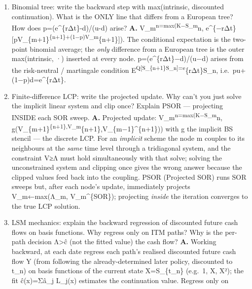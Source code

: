 \documentclass[
  11pt,
]{article}
\begin{document}
\begin{enumerate}
  the recursion for n=N,\ldots,2 is
  c(x,t\_\{n−1\})=e\^{}\{−rΔt\}E{[}v(X(t\_n),t\_n)\textbar X(t\_\{n−1\})=x{]},
  v(x,t\_\{n−1\})=max(Λ(x,t\_\{n−1\}),c(x,t\_\{n−1\})). All four methods
  (tree, FD/LCP, LSM, COS) run exactly this Bellman recursion; they
  differ \emph{only} in how they compute the conditional expectation c
  --- the continuation value.
\item
  Binomial tree: write the backward step with max(intrinsic, discounted
  continuation). What is the ONLY line that differs from a European
  tree? How does p=(e\^{}\{rΔt\}-d)/(u-d) arise? \textbf{A.}
  V\_m\textsuperscript{n=max(K−S\_m}n,
  e\^{}\{−rΔt\}{[}pV\_\{m+1\}\textsuperscript{\{n+1\}+(1−p)V\_m}\{n+1\}{]}).
  The conditional expectation is the two-point binomial average; the
  \emph{only} difference from a European tree is the outer
  max(intrinsic, ·) inserted at every node. p=(e\^{}\{rΔt\}−d)/(u−d)
  arises from the risk-neutral / martingale condition
  E\textsuperscript{Q{[}S\_\{n+1\}\textbar S\_n{]}=e}\{rΔt\}S\_n,
  i.e.~pu+(1−p)d=e\^{}\{rΔt\}.
\item
  Finite-difference LCP: write the projected update. Why can't you just
  solve the implicit linear system and clip once? Explain PSOR ---
  projecting INSIDE each SOR sweep. \textbf{A.} Projected update:
  V\_m\textsuperscript{n=max(K−S\_m}n,
  g(V\_\{m+1\}\textsuperscript{\{n+1\},V\_m}\{n+1\},V\_\{m−1\}\^{}\{n+1\}))
  with g the implicit BS stencil --- the discrete LCP. For an
  \emph{implicit} scheme the node m couples to its neighbours at the
  \emph{same} time level through a tridiagonal system, and the
  constraint V≥Λ must hold simultaneously with that solve; solving the
  unconstrained system and clipping once gives the wrong answer because
  the clipped values feed back into the coupling. PSOR (Projected SOR)
  runs SOR sweeps but, after each node's update, immediately projects
  V\_m←max(Λ\_m, V\_m\^{}\{SOR\}); projecting \emph{inside} the
  iteration converges to the true LCP solution.
\item
  LSM mechanics: explain the backward regression of discounted future
  cash flows on basis functions. Why regress only on ITM paths? Why is
  the per-path decision Λ\textgreater ĉ (not the fitted value) the cash
  flow? \textbf{A.} Working backward, at each date regress each path's
  realised discounted future cash flow Y (from following the
  already-determined later policy, discounted to t\_n) on basis
  functions of the current state X=S\_\{t\_n\} (e.g.~1, X, X²); the fit
  ĉ(x)=Σâ\_j L\_j(x) estimates the continuation value. Regress only on

\end{enumerate}
\end{document}
